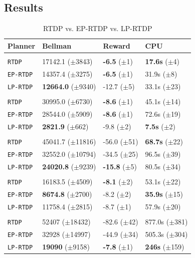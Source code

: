 \documentclass[11pt]{article}
\begin{document}
\subsection{Results}

\begin{table}
\small
\begin{tabular}{@{}llll@{}}\toprule
Planner & Bellman & Reward & CPU \\ \midrule
&\hspace{-10mm}{\it Mining Task} \\
\texttt{RTDP} & 17142.1 ($\pm$3843) 		& {\bf -6.5} ($\pm$1)  & {\bf 17.6s}   ($\pm$4) \\
\texttt{EP-RTDP} 	& 14357.4 ($\pm$3275) 		& {\bf -6.5}   ($\pm$1) & 31.9s   ($\pm$8) \\
\texttt{LP-RTDP} 	& {\bf 12664.0} ($\pm$9340) 	& -12.7 ($\pm$5) & 33.1s   ($\pm$23) \\\hline
&\hspace{-10mm}{\it Smelting Task} \\
\texttt{RTDP} 	& 30995.0 ($\pm$6730) 		& {\bf -8.6}   ($\pm$1) & 45.1s   ($\pm$14) \\
\texttt{EP-RTDP} 	& 28544.0 ($\pm$5909) 		& {\bf -8.6}   ($\pm$1) & 72.6s   ($\pm$19) \\ 
\texttt{LP-RTDP} 	& {\bf 2821.9} 	 ($\pm$662) 	& -9.8   ($\pm$2) & {\bf 7.5s}  ($\pm$2) \\ \hline
&\hspace{-10mm}{\it Wall Traversal Task} \\
\texttt{RTDP} & 45041.7 ($\pm$11816) 		& -56.0   ($\pm$51) & {\bf 68.7s}   ($\pm$22) \\
\texttt{EP-RTDP} 	& 32552.0 ($\pm$10794) 		& -34.5   ($\pm$25) & 96.5s   ($\pm$39) \\ 
\texttt{LP-RTDP} 	& {\bf 24020.8} ($\pm$9239) 	& {\bf -15.8}   ($\pm$5) & 80.5s   ($\pm$34) \\ \hline
&\hspace{-10mm}{\it Trench Traversal Task} \\
\texttt{RTDP}  	& 16183.5 ($\pm$4509) 		& {\bf -8.1}   ($\pm$2) & 53.1s   ($\pm$22) \\
\texttt{EP-RTDP} 	& {\bf 8674.8} 	($\pm$2700) 	& -8.2   ($\pm$2) & {\bf 35.9s}   ($\pm$15) \\ 
\texttt{LP-RTDP} 	& 11758.4 ($\pm$2815) 		& -8.7   ($\pm$1) & 57.9s   ($\pm$20) \\ \hline
&\hspace{-10mm}{\it Plane Traversal Task} \\
\texttt{RTDP} & 52407 ($\pm$18432) 		& -82.6   ($\pm$42) & 877.0s   ($\pm$381) \\
\texttt{EP-RTDP} 	& 32928 ($\pm$14997) 		& -44.9   ($\pm$34) & 505.3s   ($\pm$304) \\
\texttt{LP-RTDP} 	& {\bf 19090} 	 ($\pm$9158) 	& {\bf-7.8}   ($\pm$1) & {\bf 246s}  ($\pm$159) \\
\bottomrule
\end{tabular}
\caption{RTDP vs. EP-RTDP vs. LP-RTDP}
\label{table:minecraft_results}
\end{table}
\end{document}
